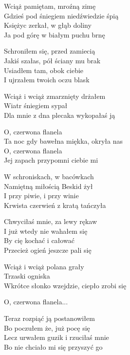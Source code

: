 \begin{text}
    Wciąż pamiętam, mroźną zimę\\
    Gdzieś pod śniegiem niedźwiedzie śpią\\
    Księżyc zerkał, w głąb doliny\\
    Ja pod górę w białym puchu brnę

    Schroniłem się, przed zamiecią\\
    Jakiś szałas, pół ściany mu brak\\
    Usiadłem tam, obok ciebie\\
    I ujrzałem twoich oczu blask

    \vin Wciąż i wciąż zmarznięty drżałem\\
    \vin Wiatr śniegiem sypał\\
    \vin Dla mnie z dna plecaka wykopałaś ją

    \vin O, czerwona flanela\\
    \vin Ta noc gdy bawełna miękka, okryła nas\\
    \vin O, czerwona flanela\\
    \vin Jej zapach przypomni ciebie mi

    W schroniskach, w bacówkach\\
    Namiętną miłością Beskid żył\\
    I przy piwie, i przy winie\\
    Krwista czerwień z kratą tańczyła

    Chwyciłaś mnie, za lewy rękaw\\
    I już wtedy nie wahałem się\\
    By cię kochać i całować\\
    Przecież ogień jeszcze pali się

    \vin Wciąż i wciąż polana grały\\
    \vin Trzaski ogniska\\
    \vin Wkrótce słonko wzejdzie, ciepło zrobi się
	
    \vin O, czerwona flanela...

    Teraz rozpiąć ją postanowiłem\\
    Bo poczułem że, już pocę się\\
    Lecz urwałem guzik i rzuciłaś mnie\\
    Bo nie chciało mi się przyszyć go


\end{text}
